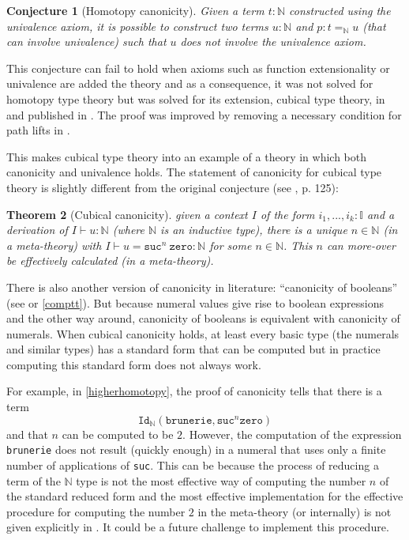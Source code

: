 \documentclass[12pt,a4paper,twoside,xetex]{book} %
\newtheorem{theorem}{Theorem}[section]
\newtheorem{conjecture}[theorem]{Conjecture}
\newcommand{\op}[1]{\mathtt{#1}}
\begin{document}
\begin{conjecture}[Homotopy canonicity]
Given a term $t: \mathbb{N}$ constructed using the univalence axiom, it is 
possible to 
construct two terms $u : \mathbb{N}$ and $p : t =_{\mathbb{N}} u$ (that can 
involve univalence) such that $u$ 
does not involve the univalence axiom.
\end{conjecture}

This conjecture can fail to hold when axioms such as function extensionality or 
univalence are added the theory and as a consequence, it was not solved for 
homotopy type theory but was solved for its extension, cubical type theory, in 
\cite{Huber2016} and published in \cite{Huber2017}. The proof was improved by 
removing a necessary condition for path lifts in
\cite{Coquand2019}.  

This makes cubical type theory into an example of a theory 
in which both canonicity and univalence holds. The statement of canonicity for 
cubical type theory is slightly different from the original conjecture (see 
\cite{Huber2016}, p. 125): 

\begin{theorem}[Cubical canonicity]\label{canonicity}
given a context $I$ of the form $i_1, ..., i_k : \mathbb{I}$ and a derivation 
of 
$I \vdash u : \mathbb{N}$ (where $\mathbb{N}$ is an inductive type), there is a 
unique $n \in \mathbb{N}$ (in a meta-theory) with $I \vdash u = \op{suc}^n \  
\op{zero} : \mathbb{N}$ for some $n \in \mathbb{N}$. This $n$ can more-over be 
effectively calculated (in a meta-theory). 
\end{theorem}

There is also another version of canonicity in literature: ``canonicity of booleans'' (see \cite{Angiuli2018} 
or \cref{comptt}). But 
because numeral values give rise to boolean expressions and the other way 
around, canonicity of booleans is equivalent with canonicity of numerals. When 
cubical canonicity holds, at least every basic type (the numerals and similar 
types) has a standard form that can be computed but in practice computing 
this standard form does not always work.

For example, in \cref{higherhomotopy}, 
the proof of canonicity tells that there is a term 
$$\texttt{Id}_{\mathbb{N}}(\texttt{brunerie}, \texttt{suc}^n 
\texttt{zero})$$ and that  $n$ can be computed to be $2$. However, the 
computation of the expression \texttt{brunerie} does not result (quickly 
enough) in a numeral that uses only a finite number of applications of 
\texttt{suc}. This can be because the process of reducing a term of the 
$\mathbb{N}$ type is not the most effective way of computing the number $n$ of 
the standard reduced form and the most effective implementation for the effective procedure for computing the 
number $2$ in the meta-theory (or internally) is 
not given explicitly in \cite{Coquand2019}. It could be a future challenge to implement this procedure. 
\end{document}

